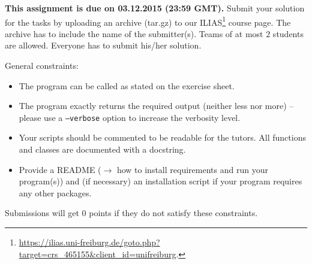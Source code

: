 \documentclass{exam}
\begin{document}


\noindent
{\bf This assignment is due on 03.12.2015 (23:59 GMT).} Submit your solution for the tasks by uploading an archive (tar.gz) to our ILIAS\footnote{ \url{https://ilias.uni-freiburg.de/goto.php?target=crs_465155&client_id=unifreiburg}.} course page. The archive has to include the name of the submitter(s). Teams of at most $2$ students are allowed. Everyone has to submit his/her solution. 

\bigskip
General constraints:

\begin{itemize}
  \item The program can be called as stated on the exercise sheet.
  \item The program exactly returns the required output (neither less nor more) -- please use a \texttt{--verbose} option to increase the verbosity level.
  \item Your scripts should be commented to be readable for the tutors. All functions and classes are documented with a docstring. 
  \item Provide a README ($\to$ how to install requirements and run your program(s)) and (if necessary) an installation script if your program requires any other packages.
\end{itemize}

\bigskip

Submissions will get $0$ points if they do not satisfy these constraints.
\end{document}
